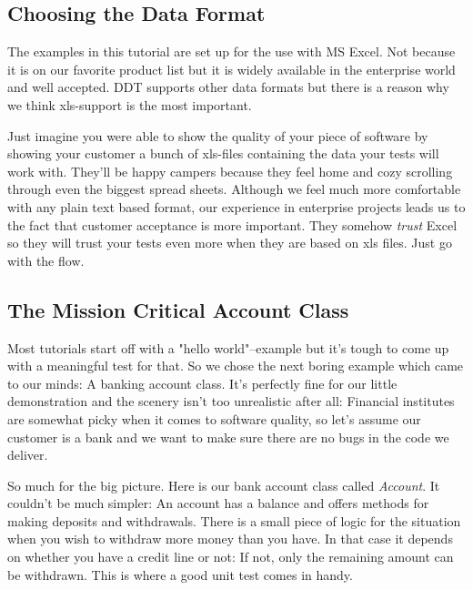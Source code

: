 \subsection{Choosing the Data Format} %
\label{sub:choosing_the_data_format}

The examples in this tutorial are set up for the use with MS Excel. Not because it is on our favorite product list but it is widely available in the enterprise world and well accepted. \textsf{DDT} supports other data formats but there is a reason why we think xls-support is the most important.

Just imagine you were able to show the quality of your piece of software by showing your customer a bunch of xls-files containing the data your tests will work with. They'll be happy campers because they feel home and cozy scrolling through even the biggest spread sheets. Although we feel much more comfortable with any plain text based format, our experience in enterprise projects leads us to the fact that customer acceptance is more important. They somehow \emph{trust} Excel so they will trust your tests even more when they are based on xls files. Just go with the flow.



\subsection{The Mission Critical Account Class} 

Most tutorials start off with a "hello world"--example but it's tough to come up with a meaningful test for that. So we chose the next boring example which came to our minds: A banking account class. It's perfectly fine for our little demonstration and the scenery isn't too unrealistic after all: Financial institutes are somewhat picky when it comes to software quality, so let's assume our customer is a bank and we want to make sure there are no bugs in the code we deliver.

So much for the big picture. Here is our bank account class called \emph{Account}. It couldn't be much simpler: An account has a balance and offers methods for making deposits and withdrawals. There is a small piece of logic for the situation when you wish to withdraw more money than you have. In that case it depends on whether you have a credit line or not: If not, only the remaining amount can be withdrawn. This is where a good unit test comes in handy.

